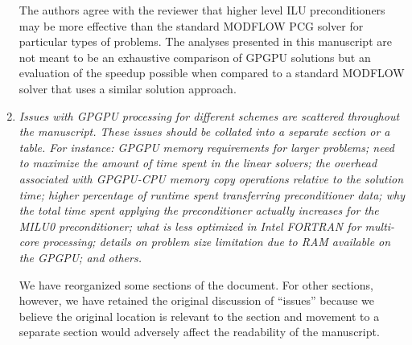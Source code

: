 \documentclass[12pt]{article} %
\begin{document}
\begin{enumerate}
The authors agree with the reviewer that higher level ILU preconditioners may be more effective than the standard MODFLOW PCG solver for particular types of problems. The analyses presented in this manuscript are not meant to be an exhaustive comparison of GPGPU solutions but an evaluation of the speedup possible when compared to a standard MODFLOW solver that uses a similar solution approach.  

\item \textit{Issues with GPGPU processing for different schemes are scattered throughout the man\-uscript. These issues should be collated into a separate section or a table. For instance: GPGPU memory requirements for larger problems; need to maximize the amount of time spent in the linear solvers; the overhead associated with GPGPU-CPU memory copy operations relative to the solution time; higher percentage of runtime spent transferring preconditioner data; why the total time spent applying the preconditioner actually increases for the MILU0 preconditioner; what is less optimized in Intel FORTRAN for multi-core processing; details on problem size limitation due to RAM available on the GPGPU; and others.} 

We have reorganized some sections of the document. For other sections, however, we have retained the original discussion of ``issues'' because we believe the original location is relevant to the section and movement to a separate section would adversely affect the readability of the manuscript.

\end{enumerate}
\end{document}
